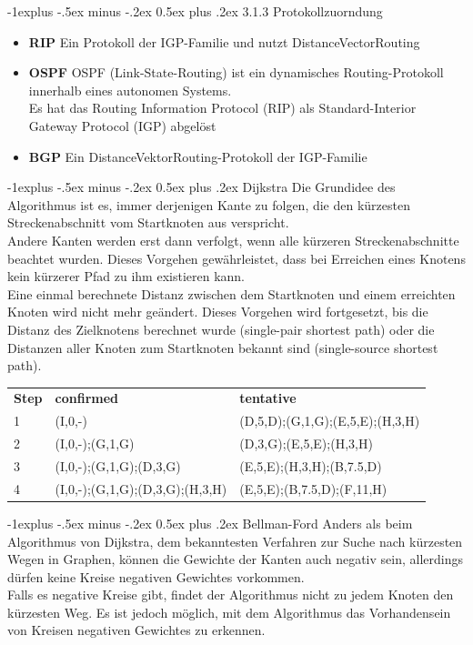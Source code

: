 \documentclass[10pt,landscape]{article}
\makeatletter
\renewcommand{\subsection}{\@startsection{subsection}{2}{0mm}%
                                {-1explus -.5ex minus -.2ex}%
                                {0.5ex plus .2ex}%
                                {\normalfont\normalsize\bfseries}}
\makeatother
\begin{document}
\begin{multicols}{3}
\subsection{3.1.3 Protokollzuorndung}
\begin{itemize}
    \item \textbf{RIP} Ein Protokoll der IGP-Familie und nutzt DistanceVectorRouting
    \item \textbf{OSPF} OSPF (Link-State-Routing) ist ein dynamisches Routing-Protokoll innerhalb eines autonomen Systems. \\
        Es hat das Routing Information Protocol (RIP) als Standard-Interior Gateway Protocol (IGP) abgel\"ost
    \item \textbf{BGP} Ein DistanceVektorRouting-Protokoll der IGP-Familie 
\end{itemize}


\subsection{Dijkstra}
Die Grundidee des Algorithmus ist es, immer derjenigen Kante zu folgen,
die den k\"urzesten Streckenabschnitt vom Startknoten aus verspricht. \\
Andere Kanten werden erst dann verfolgt, wenn alle k\"urzeren Streckenabschnitte beachtet wurden.
Dieses Vorgehen gew\"ahrleistet, dass bei Erreichen eines Knotens kein k\"urzerer Pfad zu ihm existieren kann. \\
Eine einmal berechnete Distanz zwischen dem Startknoten und einem erreichten Knoten wird nicht mehr ge\"andert.
Dieses Vorgehen wird fortgesetzt, bis die Distanz des Zielknotens berechnet wurde (single-pair shortest path)
oder die Distanzen aller Knoten zum Startknoten bekannt sind (single-source shortest path).
\tiny
\begin{tabular}{l|l|l}
\textbf{Step}   & \textbf{confirmed}    & \textbf{tentative} \\
1   & (I,0,-)           & (D,5,D);(G,1,G);(E,5,E);(H,3,H) \\
2   & (I,0,-);(G,1,G)   & (D,3,G);(E,5,E);(H,3,H) \\
3   & (I,0,-);(G,1,G);(D,3,G)   & (E,5,E);(H,3,H);(B,7.5,D) \\
4   & (I,0,-);(G,1,G);(D,3,G);(H,3,H)   & (E,5,E);(B,7.5,D);(F,11,H) \\
\end{tabular}

\subsection{Bellman-Ford}
\small
Anders als beim Algorithmus von Dijkstra, dem bekanntesten Verfahren zur Suche nach k\"urzesten Wegen in Graphen,
k\"onnen die Gewichte der Kanten auch negativ sein, allerdings d\"urfen keine Kreise negativen Gewichtes vorkommen. \\
Falls es negative Kreise gibt, findet der Algorithmus nicht zu jedem Knoten den k\"urzesten Weg.
Es ist jedoch m\"oglich, mit dem Algorithmus das Vorhandensein von Kreisen negativen Gewichtes zu erkennen.


\end{multicols}
\end{document}
